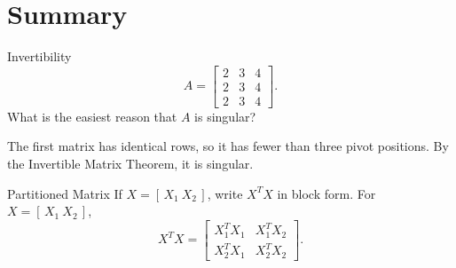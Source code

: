 \section[Summary]{Summary}

\begin{frame}{Invertibility}
  \[
A=\begin{bmatrix}2&3&4\\2&3&4\\2&3&4\end{bmatrix}.
\]
What is the easiest reason that $A$ is singular?\pause

The first matrix has identical rows, so it has fewer than three pivot positions. By the Invertible Matrix Theorem, it is singular.

\end{frame}


\begin{frame}{Partitioned Matrix}
  If $X=[\,X_1\ X_2\,]$, write $X^TX$ in block form.\pause
  For $X=[\,X_1\ X_2\,]$,
\[
X^TX=
\begin{bmatrix}
X_1^TX_1&X_1^TX_2\\
X_2^TX_1&X_2^TX_2
\end{bmatrix}.
\]

\end{frame}



